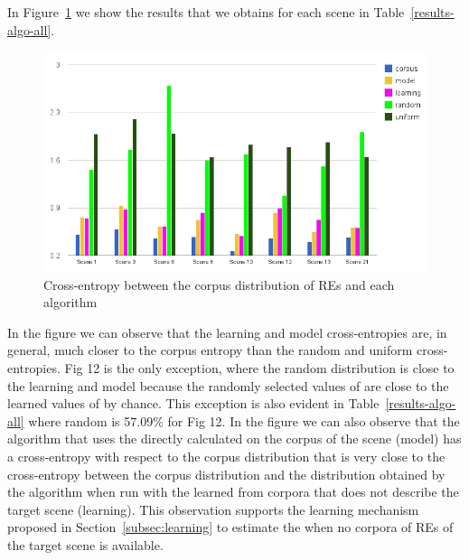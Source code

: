 In Figure~\ref{Entropy} we show the results that we obtains for each scene in Table~\ref{results-algo-all}. 

\begin{figure}[h!]
\begin{center}
\includegraphics[width=.9\textwidth]{images/entropy.jpg}
\end{center}
\vspace*{-2em}
\caption{Cross-entropy between the corpus distribution of REs and each algorithm}\label{Entropy}
\end{figure}

In the figure we can observe that the learning and model cross-entropies are, in general, much closer to the corpus entropy than the random and uniform cross-entropies. Fig 12 is the only exception, where the random distribution is close to the learning and model because the randomly selected values of \puse are close to the learned values of \puse by chance. This exception is also evident in Table~\ref{results-algo-all} where random is 57.09\% for Fig 12.
In the figure we can also observe that the algorithm that uses the \puse directly calculated on the corpus of the scene (model) has a cross-entropy with respect to the corpus distribution that is very close to the cross-entropy between the corpus distribution and the distribution obtained by the algorithm when run with the \puse learned from corpora that does not describe the target scene (learning). This observation supports the learning mechanism proposed in Section~\ref{subsec:learning} to estimate the \puse when no corpora of REs of the target scene is available. 
